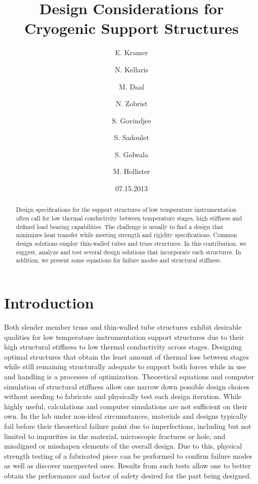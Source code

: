 \documentclass[final]{svjour2}
\begin{document}
\newcommand{\hdblarrow}{H\makebox[0.9ex][l]{$\downdownarrows$}-}
\title{Design Considerations for Cryogenic Support Structures}

\author{E. Kramer \and N. Kellaris  \and M. Daal \and N. Zobrist \and S. Govindjee \and S. Sadoulet \and S. Golwala \and M. Hollister}


\date{07.15.2013}

\maketitle

\begin{abstract}

Design specifications for the support structures of low temperature instrumentation often call for low thermal conductivity between temperature stages, high stiffness and defined load bearing capabilities.  The challenge is usually to find a design that minimizes heat transfer while meeting strength and rigidity specifications.  Common design solutions employ thin-walled tubes and truss structures. In this contribution, we suggest, analyze and test several design solutions that incorporate such structures. In addition, we present some equations for failure modes and structural stiffness.


\end{abstract}

\section{Introduction}
Both slender member truss and thin-walled tube structures exhibit desirable qualities for low temperature instrumentation support structures due to their high structural stiffness to low thermal conductivity across stages.  Designing optimal structures that obtain the least amount of thermal loss between stages while still remaining structurally adequate to support both forces while in use and handling is a processes of optimization.  Theoretical equations and computer simulation of structural stiffness allow one narrow down possible design choices without needing to fabricate and physically test each design iteration.  While highly useful, calculations and computer simulations are not sufficient on their own. In the lab under non-ideal circumstances, materials and designs typically fail before their theoretical failure point due to imperfections, including but not limited to impurities in the material, microscopic fractures or hole, and misaligned or misshapen elements of the overall design.  Due to this, physical strength testing of a fabricated piece can be performed to confirm failure modes as well as discover unexpected ones.  Results from such tests allow one to better obtain the performance and factor of safety desired for the part being designed.
\end{document}
